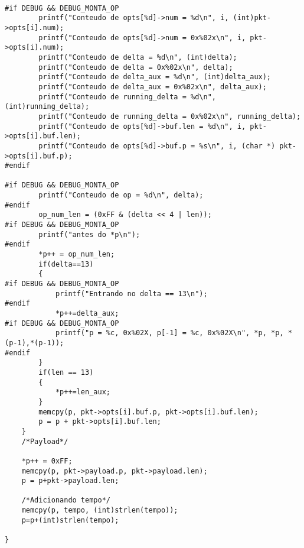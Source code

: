 \begin{lstlisting}
		
#if DEBUG && DEBUG_MONTA_OP
		printf("Conteudo de opts[%d]->num = %d\n", i, (int)pkt->opts[i].num);
		printf("Conteudo de opts[%d]->num = 0x%02x\n", i, pkt->opts[i].num);
		printf("Conteudo de delta = %d\n", (int)delta);
		printf("Conteudo de delta = 0x%02x\n", delta);
		printf("Conteudo de delta_aux = %d\n", (int)delta_aux);
		printf("Conteudo de delta_aux = 0x%02x\n", delta_aux);
		printf("Conteudo de running_delta = %d\n", (int)running_delta);
		printf("Conteudo de running_delta = 0x%02x\n", running_delta);
		printf("Conteudo de opts[%d]->buf.len = %d\n", i, pkt->opts[i].buf.len);
		printf("Conteudo de opts[%d]->buf.p = %s\n", i, (char *) pkt->opts[i].buf.p);
#endif
		
#if DEBUG && DEBUG_MONTA_OP
		printf("Conteudo de op = %d\n", delta);
#endif
		op_num_len = (0xFF & (delta << 4 | len));
#if DEBUG && DEBUG_MONTA_OP
		printf("antes do *p\n");
#endif
		*p++ = op_num_len;
		if(delta==13)
		{
#if DEBUG && DEBUG_MONTA_OP
			printf("Entrando no delta == 13\n");
#endif
			*p++=delta_aux;
#if DEBUG && DEBUG_MONTA_OP
			printf("p = %c, 0x%02X, p[-1] = %c, 0x%02X\n", *p, *p, *(p-1),*(p-1));
#endif
		}
		if(len == 13)
		{
			*p++=len_aux;
		}
		memcpy(p, pkt->opts[i].buf.p, pkt->opts[i].buf.len);
		p = p + pkt->opts[i].buf.len;
	}
	/*Payload*/
	
	*p++ = 0xFF;
	memcpy(p, pkt->payload.p, pkt->payload.len);
	p = p+pkt->payload.len;
	
	/*Adicionando tempo*/
	memcpy(p, tempo, (int)strlen(tempo));
	p=p+(int)strlen(tempo);

}


\end{lstlisting}
